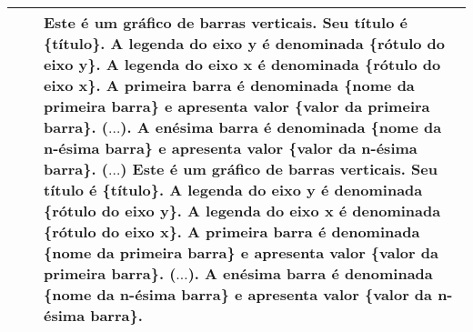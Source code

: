 \begin{table}[hbtp]
\begin{tabulary}{1\textwidth}{|L|L|L|}
    &  & {Este é um gráfico de barras verticais. Seu título é \{título\}. A legenda do eixo y é denominada \{rótulo do eixo y\}. A legenda do eixo x é denominada \{rótulo do eixo x\}. A primeira barra é denominada \{nome da primeira barra\} e apresenta valor \{valor da primeira barra\}. ($\ldots$). A enésima barra é denominada \{nome da n-ésima barra\} e apresenta valor \{valor da n-ésima barra\}. ($\ldots$) Este é um gráfico de barras verticais. Seu título é \{título\}. A legenda do eixo y é denominada \{rótulo do eixo y\}. A legenda do eixo x é denominada \{rótulo do eixo x\}. A primeira barra é denominada \{nome da primeira barra\} e apresenta valor \{valor da primeira barra\}. ($\ldots$). A enésima barra é denominada \{nome da n-ésima barra\} e apresenta valor \{valor da n-ésima barra\}.}\\
   
    \hline
\end{tabulary}
\label{XXX}
\end{table}
